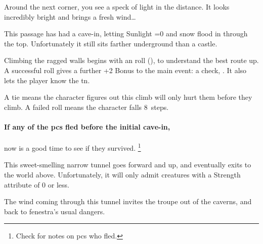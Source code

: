 \begin{multicols}{2}
  \skeinSwarm
\fi

\begin{boxtext}
  Around the next corner, you see a speck of light in the distance.
  It looks incredibly bright and brings a fresh wind\ldots
\end{boxtext}



This passage has had a cave-in, letting Sunlight \ifnum\value{temperature}=0 and snow \fi flood in through the top.
Unfortunately it still sits farther underground than a castle.

Climbing the ragged walls begins with an  roll (\tn[10]), to understand the best route up.
A successful roll gives a further +2 Bonus to the main event: a  check, \tn[14].
It also lets the player know the \gls{tn}.

A tie means the character figures out this climb will only hurt them before they climb.
A failed roll means the character falls 8~\glspl{step}.%

\paragraph{If any of the \glspl{pc} fled before the initial cave-in,}
now is a good time to see if they survived.%
\footnote{Check  for notes on \glspl{pc} who fled.}





This sweet-smelling narrow tunnel goes forward and up, and eventually exits to the world above.
Unfortunately, it will only admit creatures with a Strength \gls{attribute} of 0 or less.



The wind coming through this tunnel invites the troupe out of the caverns, and back to \gls{fenestra}'s usual dangers.

\end{multicols}

